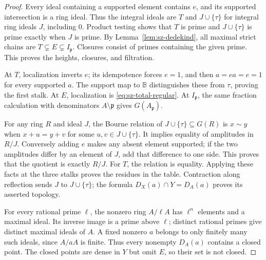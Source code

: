 \begin{proof}
Every ideal containing a supported element contains \(e\), and its
supported intersection is a ring ideal. Thus the integral ideals
are \(T\) and \(J\cup\{\tau\}\) for integral ring ideals \(J\), including
\(0\). Product testing shows that \(T\) is prime and
\(J\cup\{\tau\}\) is prime exactly when \(J\) is prime.
By Lemma~\ref{lem:sz-dedekind}, all maximal strict chains are
\(T\subsetneq E\subsetneq I_{\mathfrak p}\).
Closures consist of primes containing the given prime. This proves
the heights, closures, and filtration.

At \(T\), localization inverts \(e\); its idempotence forces \(e=1\),
and then \(a=ea=e=1\) for every supported \(a\). The support map to
\(\mathbb B\) distinguishes these from \(\tau\), proving the first
stalk. At \(E\), localization is \eqref{eq:sz-total-regular}.
At \(I_{\mathfrak p}\), the same fraction calculation with
denominators \(A\setminus\mathfrak p\) gives \(G(A_{\mathfrak p})\).

For any ring \(R\) and ideal \(J\), the Bourne relation of
\(J\cup\{\tau\}\subseteq G(R)\) is
\(x\sim y\) when \(x+u=y+v\) for some \(u,v\in J\cup\{\tau\}\).
It implies equality of amplitudes in \(R/J\).
Conversely adding \(e\) makes any absent element supported; if the
two amplitudes differ by an element of \(J\), add that difference
to one side. This proves that the quotient is exactly \(R/J\).
For \(T\), the relation is equality. Applying these facts at the
three stalks proves the residues in the table.
Contraction along reflection sends \(J\) to \(J\cup\{\tau\}\);
the formula \(D_X(a)\cap Y=D_A(a)\) proves its asserted topology.

For every rational prime \(\ell\), the nonzero ring \(A/\ell A\)
has \(\ell^n\) elements and a maximal ideal. Its inverse image is
a prime above \(\ell\); distinct rational primes give distinct
maximal ideals of \(A\). A fixed nonzero \(a\) belongs to only
finitely many such ideals, since \(A/aA\) is finite.
Thus every nonempty \(D_A(a)\) contains a closed point. The closed
points are dense in \(Y\) but omit \(E\), so their set is not closed.
\end{proof}

